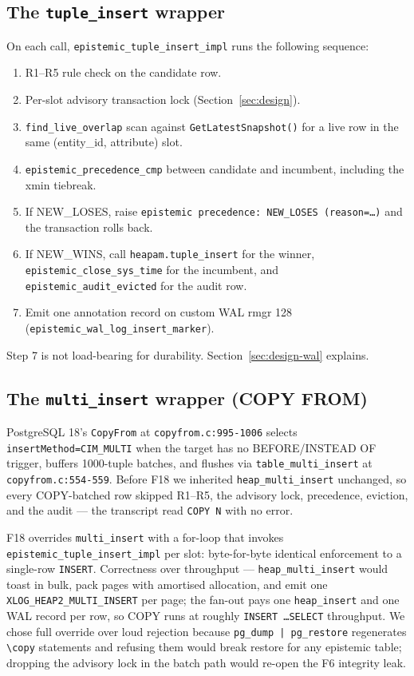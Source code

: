 \documentclass[sigconf, nonacm]{acmart}
\begin{document}
\subsection{The \texttt{tuple\_insert} wrapper}
On each call, \texttt{epistemic\_tuple\_insert\_impl} runs the following sequence:
\begin{enumerate}
\item R1--R5 rule check on the candidate row.
\item Per-slot advisory transaction lock (Section~\ref{sec:design}).
\item \texttt{find\_live\_overlap} scan against \texttt{GetLatestSnapshot()} for a live row in the same (entity\_id, attribute) slot.
\item \texttt{epistemic\_precedence\_cmp} between candidate and incumbent, including the xmin tiebreak.
\item If NEW\_LOSES, raise \texttt{epistemic precedence: NEW\_LOSES (reason=\dots)} and the transaction rolls back.
\item If NEW\_WINS, call \texttt{heapam.tuple\_insert} for the winner, \texttt{epistemic\_close\_sys\_time} for the incumbent, and \texttt{epistemic\_audit\_evicted} for the audit row.
\item Emit one annotation record on custom WAL rmgr 128 (\texttt{epistemic\_wal\_log\_insert\_marker}).
\end{enumerate}
Step 7 is not load-bearing for durability. Section~\ref{sec:design-wal} explains.

\subsection{The \texttt{multi\_insert} wrapper (COPY FROM)}
PostgreSQL 18's \texttt{CopyFrom} at \texttt{copyfrom.c:995-1006} selects \texttt{insertMethod=CIM\_MULTI} when the target has no BEFORE/INSTEAD OF trigger, buffers 1000-tuple batches, and flushes via \texttt{table\_multi\_insert} at \texttt{copyfrom.c:554-559}. Before F18 we inherited \texttt{heap\_multi\_insert} unchanged, so every COPY-batched row skipped R1--R5, the advisory lock, precedence, eviction, and the audit --- the transcript read \texttt{COPY N} with no error.

F18 overrides \texttt{multi\_insert} with a for-loop that invokes \texttt{epistemic\_tuple\_insert\_impl} per slot: byte-for-byte identical enforcement to a single-row \texttt{INSERT}. Correctness over throughput --- \texttt{heap\_multi\_insert} would toast in bulk, pack pages with amortised allocation, and emit one \texttt{XLOG\_HEAP2\_MULTI\_INSERT} per page; the fan-out pays one \texttt{heap\_insert} and one WAL record per row, so COPY runs at roughly \texttt{INSERT \dots SELECT} throughput. We chose full override over loud rejection because \texttt{pg\_dump | pg\_restore} regenerates \texttt{\textbackslash copy} statements and refusing them would break restore for any epistemic table; dropping the advisory lock in the batch path would re-open the F6 integrity leak.
\end{document}
